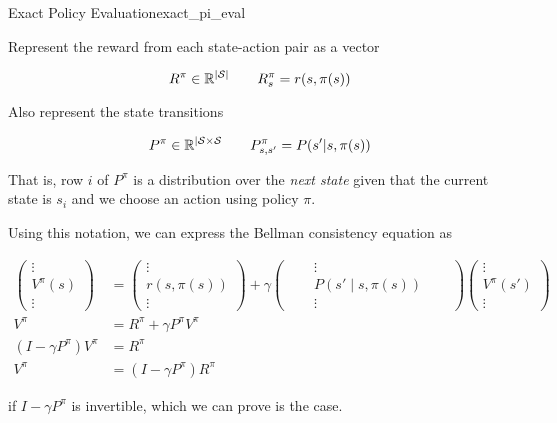 \documentclass[../main/main]{subfiles}
\begin{document}
\begin{theorem}{Exact Policy Evaluation}{exact_pi_eval}

Represent the reward from each state-action pair as a vector

\[ R^\pi \in \mathbb{R}^{|\mathcal{S}|} \qquad R^\pi_s = r(s, \pi(s)) \]

Also represent the state transitions

\[ P^\pi \in \mathbb{R}^{|\mathcal{S} \times \mathcal{S}} \qquad P^\pi_{s, s'} = P(s' | s, \pi(s)) \]

That is, row $i$ of $P^\pi$ is a distribution over the \emph{next state}
given that the current state is $s_i$
and we choose an action using policy $\pi$.

Using this notation, we can express the Bellman consistency equation as

\begin{align*}
    \begin{pmatrix}
        \vdots \\ V^\pi(s) \\ \vdots
    \end{pmatrix}
    &=
    \begin{pmatrix}
        \vdots \\ r(s, \pi(s)) \\ \vdots
    \end{pmatrix}
    +
    \gamma
    \begin{pmatrix}
        & \vdots & \\
        \quad & P(s' \mid s, \pi(s)) & \quad \\
        & \vdots &
    \end{pmatrix}
    \begin{pmatrix}
        \vdots \\ V^\pi(s') \\ \vdots
    \end{pmatrix} \\
    V^\pi &= R^\pi + \gamma P^\pi V^\pi \\
    (I - \gamma P^\pi) V^\pi &= R^\pi \\
    V^\pi &= (I - \gamma P^\pi) R^\pi
\end{align*}

if $I - \gamma P^\pi$ is invertible, which we can prove is the case.


\end{theorem}
\end{document}
